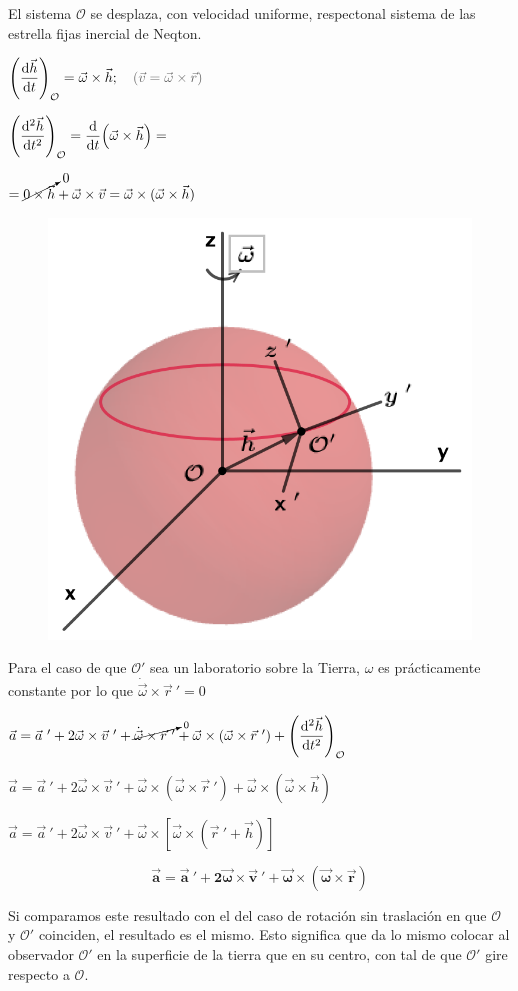 \vspace{35mm} %
\begin{multicols}{2}
El sistema $\mathcal O$ se desplaza, con velocidad uniforme, respectonal sistema de las estrella fijas inercial de Neqton.	

$\displaystyle \left( \dv{\vec h}{t} \right)_{\mathcal O}=\vec \omega \times \vec h;  \quad \textcolor{gris}{(\vec v=\vec \omega \times \vec r)}$

$\displaystyle \left( \dv[2]{\vec h}{t} \right)_{\mathcal O}= \dv{t} (\vec \omega \times \vec h )= $ 

$=\displaystyle \cancelto{0}{0 \times \vec h} + \vec \omega \times \vec v= \vec \omega \times (\vec \omega \times \vec h)$

\begin{figure}[H]
	\centering
	\includegraphics[width=.35\textwidth]{imagenes/imagenes10/T10IM05.png}
\end{figure}
\end{multicols}

Para el caso de que $\mathcal O'$ sea un laboratorio sobre la Tierra, $\omega$ es prácticamente constante por lo que $\dot{\vec \omega} \times \vec r\ '=0$


$\vec a = \vec a\ ' + 2 \vec \omega \times \vec v\ '+ \cancelto{0}{\dot{\vec \omega}\times \vec r \ ' }+ \vec \omega \times (\vec \omega \times \vec r \ ')+ \left( \displaystyle \dv[2]{\vec h}{t} \right)_{\mathcal O}$


$\vec a = \vec a\ ' + 2 \vec \omega \times \vec v\ '+ \vec \omega \times (\vec \omega \times \vec r \ ')+ \vec \omega \times (\vec \omega \times \vec h)$


$\vec a = \vec a\ ' + 2 \vec \omega \times \vec v\ '+ \vec \omega \times [\vec \omega \times (\vec r \ ' + \vec h)]$

$$\boldsymbol{
\vec a = \vec a\ ' + 2 \vec \omega \times \vec v\ '+ \vec \omega \times (\vec \omega \times \vec r)
}$$



Si comparamos este resultado con el del caso de rotación sin traslación en que $\mathcal O$ y $\mathcal O'$ coinciden, el resultado es el mismo. Esto significa que da lo mismo colocar al observador $\mathcal O'$ en la superficie de la tierra que en su centro, con tal de que $\mathcal O'$ gire respecto a $\mathcal O$.

